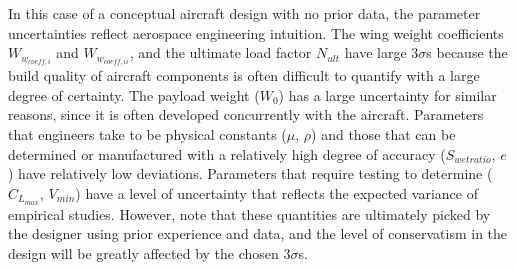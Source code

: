 In this case of a conceptual aircraft design with no prior data,
the parameter uncertainties reflect aerospace engineering intuition.
The wing weight coefficients $W_{w_{coeff,i}}$ and $W_{w_{coeff,ii}}$, and the ultimate load factor $N_{ult}$ have
large $3\sigma$s because the build quality of aircraft components is
often difficult to quantify with a large degree of certainty.
The payload weight ($W_0$) has a large uncertainty for similar reasons,
since it is often developed concurrently with the aircraft.
Parameters that engineers take to be
physical constants ($\mu$, $\rho$) and those that can be determined or manufactured with a relatively
high degree of accuracy ($S_{wetratio}$, $e$) have relatively low deviations.
Parameters that require testing to determine ($C_{L_{max}}$, $V_{min}$) have a level of uncertainty
that reflects the expected variance of empirical studies. However, note that
these quantities are ultimately picked by the designer using prior experience and data,
and the level of conservatism in the
design will be greatly affected by the chosen $3\sigma$s.
